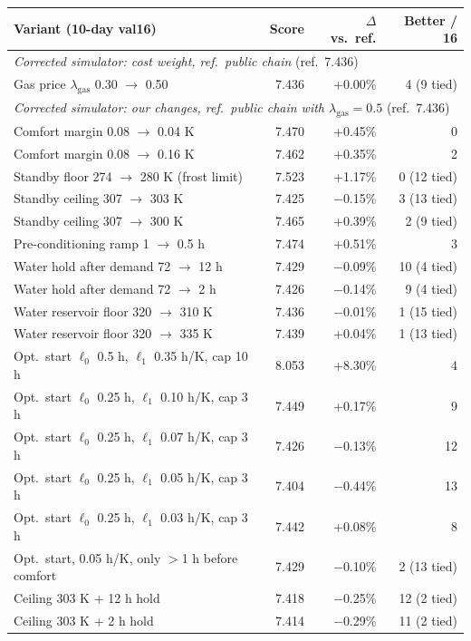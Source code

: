 \begin{tabular}{lrrr}
\toprule
Variant (10-day val16) & Score & $\Delta$ vs.\ ref. & Better / 16 \\
\midrule
\multicolumn{4}{l}{\emph{Corrected simulator: cost weight, ref.\ public chain} (ref.\ 7.436)} \\
Gas price $\lambda_{\mathrm{gas}}$ 0.30 $\to$ 0.50 & 7.436 & +0.00\% & 4 (9 tied) \\
\midrule
\multicolumn{4}{l}{\emph{Corrected simulator: our changes, ref.\ public chain with $\lambda_{\mathrm{gas}}=0.5$} (ref.\ 7.436)} \\
Comfort margin 0.08 $\to$ 0.04 K & 7.470 & +0.45\% & 0 \\
Comfort margin 0.08 $\to$ 0.16 K & 7.462 & +0.35\% & 2 \\
Standby floor 274 $\to$ 280 K (frost limit) & 7.523 & +1.17\% & 0 (12 tied) \\
Standby ceiling 307 $\to$ 303 K & 7.425 & $-$0.15\% & 3 (13 tied) \\
Standby ceiling 307 $\to$ 300 K & 7.465 & +0.39\% & 2 (9 tied) \\
Pre-conditioning ramp 1 $\to$ 0.5 h & 7.474 & +0.51\% & 3 \\
Water hold after demand 72 $\to$ 12 h & 7.429 & $-$0.09\% & 10 (4 tied) \\
Water hold after demand 72 $\to$ 2 h & 7.426 & $-$0.14\% & 9 (4 tied) \\
Water reservoir floor 320 $\to$ 310 K & 7.436 & $-$0.01\% & 1 (15 tied) \\
Water reservoir floor 320 $\to$ 335 K & 7.439 & +0.04\% & 1 (13 tied) \\
Opt.\ start $\ell_0$ 0.5 h, $\ell_1$ 0.35 h/K, cap 10 h & 8.053 & +8.30\% & 4 \\
Opt.\ start $\ell_0$ 0.25 h, $\ell_1$ 0.10 h/K, cap 3 h & 7.449 & +0.17\% & 9 \\
Opt.\ start $\ell_0$ 0.25 h, $\ell_1$ 0.07 h/K, cap 3 h & 7.426 & $-$0.13\% & 12 \\
Opt.\ start $\ell_0$ 0.25 h, $\ell_1$ 0.05 h/K, cap 3 h & 7.404 & $-$0.44\% & 13 \\
Opt.\ start $\ell_0$ 0.25 h, $\ell_1$ 0.03 h/K, cap 3 h & 7.442 & +0.08\% & 8 \\
Opt.\ start, 0.05 h/K, only $>$1 h before comfort & 7.429 & $-$0.10\% & 2 (13 tied) \\
Ceiling 303 K + 12 h hold & 7.418 & $-$0.25\% & 12 (2 tied) \\
Ceiling 303 K + 2 h hold & 7.414 & $-$0.29\% & 11 (2 tied) \\

\end{tabular}
